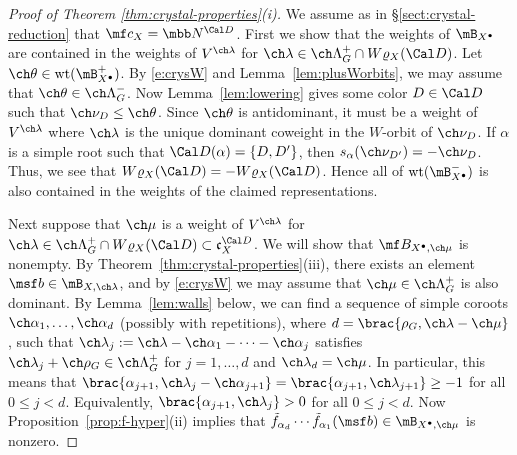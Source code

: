 \documentclass[final]{amsart}
\theoremstyle{remark}
\theoremstyle{definition}
\numberwithin{equation}{section}
\begin{document}
\begin{proof}[Proof of Theorem \ref{thm:crystal-properties}(i)]
We assume as in \S\ref{sect:crystal-reduction} that $\mf c_X = \mbb N^{\Cal D}$. 
First we show that the weights of $\mB_{X^\bullet}$ are contained in the weights of 
$V^{\ch\lambda}$ for $\ch\lambda \in \ch\Lambda^+_G \cap W\varrho_X(\Cal D)$. 
Let $\ch\theta \in \mathrm{wt}(\mB_{X^\bullet}^+)$. 
By \eqref{e:crysW} and Lemma~\ref{lem:plusWorbits}, 
we may assume that $\ch\theta \in \ch\Lambda^-_G$. 
Now Lemma~\ref{lem:lowering} gives some color $D\in \Cal D$ such that 
$\ch\nu_D \le \ch\theta$. Since $\ch\theta$ is antidominant, 
it must be a weight of $V^{\ch\lambda}$ where $\ch\lambda$ is the unique dominant coweight in 
the $W$-orbit of $\ch\nu_D$.
If $\alpha$ is a simple root such that $\Cal D(\alpha) = \{ D, D' \}$, then 
$s_\alpha(\ch\nu_{D'}) = -\ch\nu_D$. Thus, we see that 
$W\varrho_X(\Cal D) = -W\varrho_X(\Cal D)$. Hence all of $\mathrm{wt}(\mB_{X^\bullet}^-)$ 
is also contained in the weights of the claimed representations. 

Next suppose that $\ch\mu$ is a weight of $V^{\ch\lambda}$ for $\ch\lambda \in \ch\Lambda^+_G \cap W\varrho_X(\Cal D) \subset \mathfrak c_X^{\Cal D}$. 
We will show that $\mf B_{X^\bullet,\ch\mu}$ is nonempty. 
By Theorem~\ref{thm:crystal-properties}(iii), there exists
an element $\msf b \in \mB_{X,\ch\lambda}$, and  
by \eqref{e:crysW} we may assume that 
$\ch\mu \in \ch\Lambda^+_G$ is also dominant. 
By Lemma~\ref{lem:walls} below, 
we can find a sequence of simple coroots $\ch\alpha_1,\dotsc, \ch\alpha_d$
(possibly with repetitions), where $d = \brac{\rho_G,\ch\lambda-\ch\mu}$,
such that $\ch\lambda_j := \ch\lambda-\ch\alpha_1-\dotsb-\ch\alpha_j$ 
satisfies $\ch\lambda_j + \ch\rho_G \in \ch\Lambda^+_G$ 
for $j=1,\dotsc,d$ and $\ch\lambda_d = \ch\mu$. 
In particular, this means that $\brac{\alpha_{j+1},\ch\lambda_j-\ch\alpha_{j+1}}
= \brac{\alpha_{j+1},\ch\lambda_{j+1}} \ge -1$ for all $0\le j<d$. 
Equivalently, $\brac{\alpha_{j+1},\ch\lambda_j} > 0$ for all $0\le j < d$.
Now Proposition~\ref{prop:f-hyper}(ii) 
implies that $\tilde f_{\alpha_d} \dotsb \tilde f_{\alpha_1} (\msf b) \in \mB_{X^\bullet,\ch\mu}$ 
is nonzero. 
\end{proof}
\end{document}
